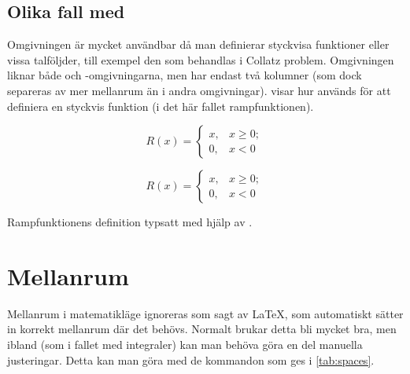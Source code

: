 \documentclass[10pt,../../a4.tex]{subfiles}
\begin{document}
\subsection{Olika fall med }
Omgivningen  är mycket användbar då man definierar styckvisa
funktioner eller vissa talföljder, till exempel den som behandlas i 
Collatz problem.
Omgivningen liknar både  och -omgivningarna, men
har endast två kolumner (som dock separeras av mer mellanrum än i andra
omgivningar).  visar hur  används för
att definiera en styckvis funktion (i det här fallet rampfunktionen).

\begin{kod}[tbp]
	\centering 
	\begin{minipage}[b]{0.35\textwidth} %
		\begin{equation}
			R(x) = \begin{cases}
				x, & x \geq 0; \\ 
				0, & x < 0
			\end{cases}
		\end{equation}
	\end{minipage}
	\quad
	\begin{minipage}{0.375\textwidth} %
		\begin{latexcode}
\begin{equation}
R(x) = \begin{cases}	
x, & x \geq 0; \\
0, & x < 0
\end{cases}
\end{equation}
		\end{latexcode}
	\end{minipage}
	\caption{Rampfunktionens definition typsatt med hjälp av .}
	\label{ex:cases}
\end{kod}


\section{Mellanrum} %
Mellanrum i matematikläge ignoreras som sagt av \LaTeX, som automatiskt
sätter in korrekt mellanrum där det behövs. Normalt brukar detta bli
mycket bra, men ibland (som i fallet med integraler) kan man behöva göra
en del manuella justeringar. Detta kan man göra med de kommandon som ges
i \cref{tab:spaces}.
\end{document}
